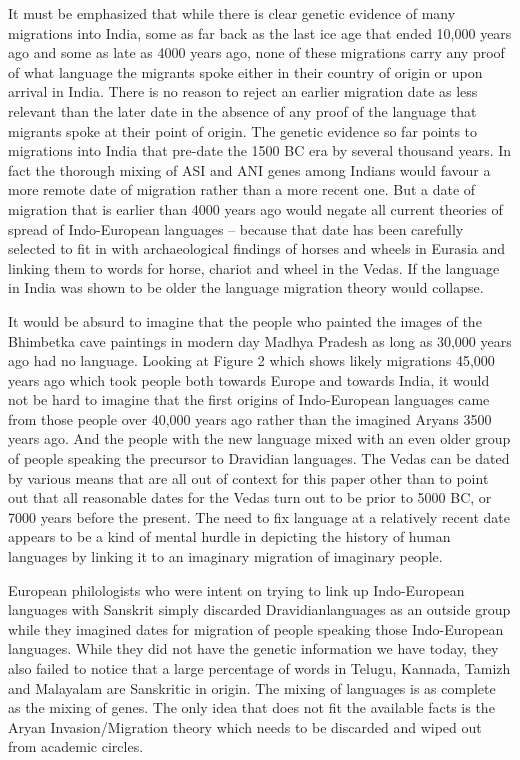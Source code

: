 It must be emphasized that while there is clear genetic evidence of many migrations into India, some as far back as the last ice age that ended 10,000 years ago and some as late as 4000 years ago, none of these migrations carry any proof of what language the migrants spoke either in their country of origin or upon arrival in India. There is no reason to reject an earlier migration date as less relevant than the later date in the absence of any proof of the language that migrants spoke at their point of origin. The genetic evidence so far points to migrations into India that pre-date the 1500 BC era by several thousand years. In fact the thorough mixing of ASI and ANI genes among Indians would favour a more remote date of migration rather than a more recent one. But a date of migration that is earlier than 4000 years ago would negate all current theories of spread of Indo-European languages – because that date has been carefully selected to fit in with archaeological findings of horses and wheels in Eurasia and linking them to words for horse, chariot and wheel in the Vedas. If the language in India was shown to be older the language migration theory would collapse.

It would be absurd to imagine that the people who painted the images of the Bhimbetka cave paintings in modern day Madhya Pradesh as long as 30,000 years ago had no language. Looking at Figure 2 which shows likely migrations 45,000 years ago which took people both towards Europe and towards India, it would not be hard to imagine that the first origins of Indo-European languages came from those people over 40,000 years ago rather than the imagined Aryans 3500 years ago. And the people with the new language mixed with an even older group of people speaking the precursor to Dravidian languages. The Vedas can be dated by various means that are all out of context for this paper other than to point out that all reasonable dates for the Vedas turn out to be prior to 5000 BC, or 7000 years before the present. The need to fix language at a relatively recent date appears to be a kind of mental hurdle in depicting the history of human languages by linking it to an imaginary migration of imaginary people.

European philologists who were intent on trying to link up Indo-\break European languages with Sanskrit simply discarded Dravidian\break languages as an outside group while they imagined dates for migration of people speaking those Indo-European languages. While they did not have the genetic information we have today, they also failed to notice that a large percentage of words in Telugu, Kannada, Tamizh and Malayalam are Sanskritic in origin. The mixing of languages is as complete as the mixing of genes. The only idea that does not fit the available facts is the Aryan Invasion/Migration theory which needs to be discarded and wiped out from academic circles.


